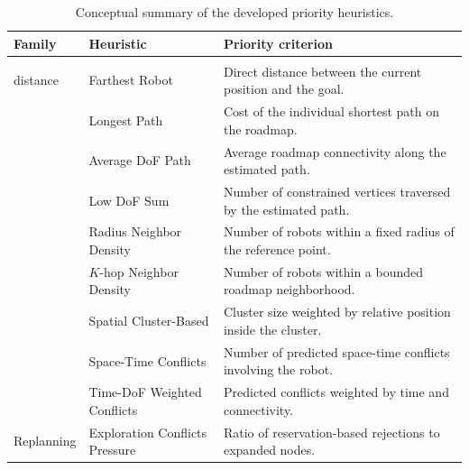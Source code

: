 \begin{table}[H]
\centering
\caption{Conceptual summary of the developed priority heuristics.}
\label{tab:heuristic_conceptual_summary}
\scriptsize
\renewcommand{\arraystretch}{1.22}
\setlength{\tabcolsep}{5pt}

\begingroup
\renewcommand{\tabularxcolumn}[1]{m{#1}}

\begin{tabularx}{\textwidth}{
    >{\centering\arraybackslash}m{2.15cm}
    >{\RaggedRight\arraybackslash}m{4.35cm}
    >{\RaggedRight\arraybackslash}X
}
\toprule
\textbf{Family} & \textbf{Heuristic} & \textbf{Priority criterion} \\
\midrule

\multirow[c]{2}{2.15cm}{\centering Roadmap\\distance}
& Farthest Robot
& Direct distance between the current position and the goal. \\

& Longest Path
& Cost of the individual shortest path on the roadmap. \\

\midrule

\multirow[c]{2}{2.15cm}{\centering Topology}
& Average DoF Path
& Average roadmap connectivity along the estimated path. \\

& Low DoF Sum
& Number of constrained vertices traversed by the estimated path. \\

\midrule

\multirow[c]{3}{2.15cm}{\centering Surroundings}
& Radius Neighbor Density
& Number of robots within a fixed radius of the reference point. \\

& \(K\)-hop Neighbor Density
& Number of robots within a bounded roadmap neighborhood. \\

& Spatial Cluster-Based
& Cluster size weighted by relative position inside the cluster. \\

\midrule

\multirow[c]{2}{2.15cm}{\centering Conflicts}
& Space-Time Conflicts
& Number of predicted space-time conflicts involving the robot. \\

& Time-DoF Weighted Conflicts
& Predicted conflicts weighted by time and connectivity. \\

\midrule

Replanning
& Exploration Conflicts Pressure
& Ratio of reservation-based rejections to expanded nodes. \\

\bottomrule
\end{tabularx}

\endgroup
\end{table}






